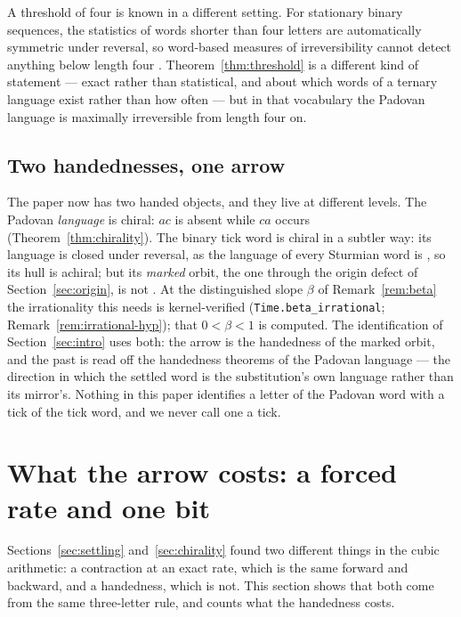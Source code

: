 \documentclass[11pt]{amsart}
\theoremstyle{plain}
\theoremstyle{definition}
\theoremstyle{remark}
\begin{document}
A threshold of four is known in a different setting. For stationary binary sequences, the
statistics of words shorter than four letters are automatically symmetric under reversal, so
word-based measures of irreversibility cannot detect anything below length four
\cite{arola2023}. Theorem~\ref{thm:threshold} is a different kind of statement --- exact
rather than statistical, and about which words of a ternary language exist rather than how
often --- but in that vocabulary the Padovan language is maximally irreversible from length
four on.

\subsection{Two handednesses, one arrow}
\label{sec:twohands}

The paper now has two handed objects, and they live at different levels. The Padovan
\emph{language} is chiral: $ac$ is absent while $ca$ occurs (Theorem~\ref{thm:chirality}).
The binary tick word is chiral in a subtler way: its language is closed under reversal, as
the language of every Sturmian word is \cite{lothaire2002}, so its hull is achiral; but its
\emph{marked} orbit, the one through the origin defect of Section~\ref{sec:origin}, is not
\cite{barbieri2021}. At the distinguished slope $\beta$ of Remark~\ref{rem:beta} the
irrationality this needs is kernel-verified (\texttt{Time.beta\_irrational};
Remark~\ref{rem:irrational-hyp}); that $0 < \beta < 1$ is computed.  The identification of
Section~\ref{sec:intro} uses both: the arrow is the handedness of the marked orbit, and the
past is read off the handedness theorems of the Padovan language --- the direction in which
the settled word is the substitution's own language rather than its mirror's.{} Nothing in this paper identifies a letter of the Padovan word with a tick of
the tick word, and we never call one a tick.

\section{What the arrow costs: a forced rate and one bit}
\label{sec:cost}

Sections~\ref{sec:settling} and~\ref{sec:chirality} found two different things in the cubic
arithmetic: a contraction at an exact rate, which is the same forward and backward, and a
handedness, which is not. This section shows that both come from the same three-letter rule,
and counts what the handedness costs.
\end{document}
